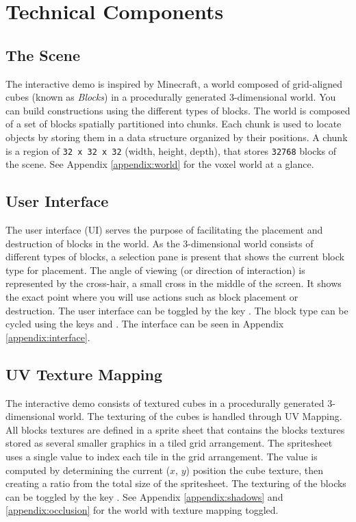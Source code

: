 \documentclass[a4paper,11pt,titlepage]{scrartcl}
\begin{document}
\section{Technical Components}
\subsection{The Scene}
\label{section:scene}
The interactive demo is inspired by Minecraft, a world composed of grid-aligned cubes (known as \textit{Blocks}) in a procedurally generated 3-dimensional world.  You can build constructions using the different types of blocks.  The world is composed of a set of blocks spatially partitioned into chunks.  Each chunk is used to locate objects by storing them in a data structure organized by their positions.   A chunk is a region of \texttt{32 x 32 x 32} (width, height, depth), that stores \texttt{32768} blocks of the scene.
\vskip 2.5mm\noindent
See Appendix \ref{appendix:world} for the voxel world at a glance.
  
\subsection{User Interface}
\label{section:interface}
The user interface (UI) serves the purpose of facilitating the placement and destruction of blocks in the world.  As the 3-dimensional world consists of different types of blocks, a selection pane is present that shows the current block type for placement.  The angle of viewing (or direction of interaction) is represented by the cross-hair, a small cross in the middle of the screen.  It shows the exact point where you will use actions such as block placement or destruction.
\vskip 2.5mm\noindent
The user interface can be toggled by the key .  The block type can be cycled using the keys  and .  The interface can be seen in Appendix \ref{appendix:interface}. 

\subsection{UV Texture Mapping}
\label{section:texture}
The interactive demo consists of textured cubes in a procedurally generated 3-dimensional world.  The texturing of the cubes is handled through UV Mapping.  All blocks textures are defined in a sprite sheet that contains the blocks textures stored as several smaller graphics in a tiled grid arrangement.  The spritesheet uses a single value to index each tile in the grid arrangement.  The value is computed by determining the current ($x$, $y$) position the cube texture, then creating a ratio from the total size of the spritesheet.
\vskip 2.5mm\noindent
The texturing of the blocks can be toggled by the key .  See Appendix \ref{appendix:shadows} and \ref{appendix:occlusion} for the world with texture mapping toggled.
\end{document}
